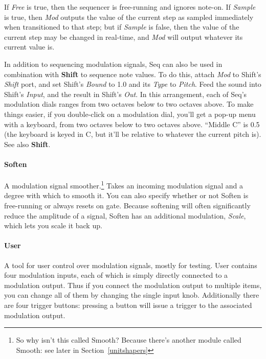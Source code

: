\documentclass{article}
\begin{document}
If {\it Free} is true, then the sequencer is free-running and ignores note-on.  If {\it Sample} is true, then {\it Mod} outputs the value of the current step as sampled immediately when transitioned to that step; but if {\it Sample} is false, then the value of the current step may be changed in real-time, and {\it Mod} will output whatever its current value is.

In addition to sequencing modulation signals, Seq can also be used in combination with {\bf Shift} to sequence note values.  To do this, attach {\it Mod} to Shift's {\it Shift} port, and set Shift's {\it Bound} to 1.0 and its {\it Type} to {\it Pitch}.  Feed the sound into Shift's {\it Input}, and the result in Shift's {\it Out}.  In this arrangement, each of Seq's modulation dials ranges from two octaves below to two octaves above.  To make things easier, if you double-click on a modulation dial, you'll get a pop-up menu with a keyboard, from two octaves below to two octaves above.  ``Middle C'' is 0.5 (the keyboard is keyed in C, but it'll be relative to whatever the current pitch is).  See also {\bf Shift}.

\paragraph{Soften}  A modulation signal smoother.\footnote{So why isn't this called Smooth?  Because there's another module called Smooth: see later in Section~\ref{unitshapers}}  Takes an incoming modulation signal and a degree with which to smooth it.  You can also specify whether or not Soften is free-running or always resets on gate.   Because softening will often significantly reduce the amplitude of a signal, Soften has an additional modulation, {\it Scale}, which lets you scale it back up.


\paragraph{User}  A tool for user control over modulation signals, mostly for testing.  User contains four modulation inputs, each of which is simply directly connected to a modulation output.  Thus if you connect the modulation output to multiple items, you can change all of them by changing the single input knob. Additionally there are four trigger buttons: pressing a button will issue a trigger to the associated modulation output.

\end{document}

